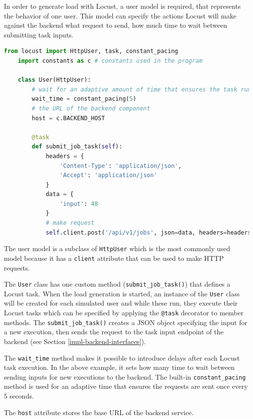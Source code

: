 In order to generate load with Locust, a user model is required, that represents the behavior of one user. This model can specify the actions Locust will make against the backend \eg what request to send, how much time to wait between submitting task inputs.

\vspace{0.5cm}
\begin{minipage}{\linewidth}
	\begin{lstlisting}[language=python, caption={Locust user model}, label={lst:locust-user}]
	from locust import HttpUser, task, constant_pacing
	import constants as c # constants used in the program
	
	class User(HttpUser):
		# wait for an adaptive amount of time that ensures the task runs (at most) once every X seconds
		wait_time = constant_pacing(5)
		# the URL of the backend component
		host = c.BACKEND_HOST
		
		@task
		def submit_job_task(self):
			headers = {
				'Content-Type': 'application/json',
				'Accept': 'application/json'
			}
			data = {
				'input': 48
			}
			# make request
			self.client.post('/api/v1/jobs', json=data, headers=headers)\end{lstlisting}
\end{minipage}

The user model is a subclass of \texttt{HttpUser} which is the most commonly used model because it has a \texttt{client} attribute that can be used to make HTTP requests.

The \texttt{User} class has one custom method (\texttt{submit\_job\_task()}) that defines a Locust task. When the load generation is started, an instance of the \texttt{User} class will be created for each simulated user and while these run, they execute their Locust tasks which can be specified \eg by applying the \texttt{@task} decorator to member methods. The \texttt{submit\_job\_task()} creates a JSON object specifying the input for a new execution, then sends the request to the task input endpoint of the backend (see Section \ref{impl-backend-interfaces}).

The \texttt{wait\_time} method makes it possible to introduce delays after each Locust task execution. In the above example, it sets how many time to wait between sending inputs for new executions to the backend. The built-in \texttt{constant\_pacing} method is used for an adaptive time that ensures the requests are sent once every 5 seconds.

The \texttt{host} attribute stores the base URL of the backend service.

